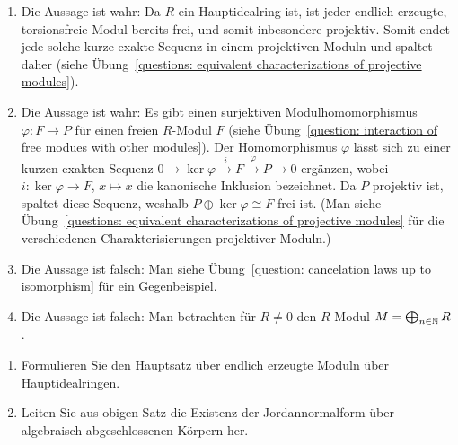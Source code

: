 \begin{solution}
\begin{enumerate}
    \item
      Die Aussage ist wahr:
      Da $R$ ein Hauptidealring ist, ist jeder endlich erzeugte, torsionsfreie Modul bereits frei, und somit inbesondere projektiv.
      Somit endet jede solche kurze exakte Sequenz in einem projektiven Moduln und spaltet daher (siehe Übung~\ref{questions: equivalent characterizations of projective modules}).
    
    \item
      Die Aussage ist wahr:
      Es gibt einen surjektiven Modulhomomorphismus $\varphi \colon F \to P$ für einen freien $R$-Modul $F$ (siehe Übung~\ref{question: interaction of free modues with other modules}).
      Der Homomorphismus $\varphi$ lässt sich zu einer kurzen exakten Sequenz $0 \to \ker \varphi \xrightarrow{i} F \xrightarrow{\varphi} P \to 0$ ergänzen, wobei $i \colon \ker \varphi \to F$, $x \mapsto x$ die kanonische Inklusion bezeichnet.
      Da $P$ projektiv ist, spaltet diese Sequenz, weshalb $P \oplus \ker \varphi \cong F$ frei ist.
      (Man siehe Übung~\ref{questions: equivalent characterizations of projective modules} für die verschiedenen Charakterisierungen projektiver Moduln.)
      
    \item
      Die Aussage ist falsch:
      Man siehe Übung~\ref{question: cancelation laws up to isomorphism} für ein Gegenbeispiel.
      
    \item
      Die Aussage ist falsch:
      Man betrachten für $R \neq 0$ den $R$-Modul $M = \bigoplus_{n \in \mathbb{N}} R$.
  \end{enumerate}
\end{solution}


\begin{question}[subtitle = Herleitung der Jordannormalform]
  \begin{enumerate}
    \item
      Formulieren Sie den Hauptsatz über endlich erzeugte Moduln über Hauptidealringen.
    \item
      Leiten Sie aus obigen Satz die Existenz der Jordannormalform über algebraisch abgeschlossenen Körpern her.
  \end{enumerate}
\end{question}


